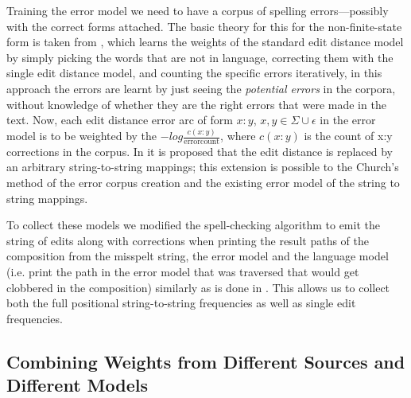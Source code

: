 \documentclass[a4paper,12pt]{article}
\begin{document}
Training the error model we need to have a corpus of spelling errors---possibly
with the correct forms attached. The basic theory for this for the
non-finite-state form is taken from \cite{church1991probability}, which learns
the weights of the standard edit distance model by simply picking the words
that are not in language, correcting them with the single edit distance model,
and counting the specific errors iteratively, in this approach the errors are
learnt by just seeing the \emph{potential errors} in the corpora, without
knowledge of whether they are the right errors that were made in the text.
Now, each edit distance error arc of form $x:y$, $x, y \in \Sigma \cup
{\epsilon}$ in the error model is to be weighted by the $-log
\frac{c(x:y)}{\mathrm{error count}}$, where $c(x:y)$ is the count of x:y
corrections in the corpus. In \cite{brill2000improved} it is proposed that the
edit distance is replaced by an arbitrary string-to-string mappings; this
extension is possible to the Church's method of the error corpus creation and
the existing error model of the string to string mappings. 

To collect these models we modified the spell-checking algorithm to emit the
string of edits along with corrections when printing the result paths of the
composition from the misspelt string, the error model and the language model
(i.e. print the path in the error model that was traversed that would get
clobbered in the composition) similarly as is done in
\cite{ristad1998learning}.  This allows us to collect both the full positional
string-to-string frequencies as well as single edit frequencies.

\subsection{Combining Weights from Different Sources and Different Models}
\label{subsec:combining-weights}
\end{document}
